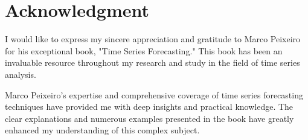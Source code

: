 \documentclass[journal]{IEEEtran}
\begin{document}
\section*{Acknowledgment}
I would like to express my sincere appreciation and gratitude to Marco
Peixeiro for his exceptional book, "Time Series Forecasting." This book has
been an invaluable resource throughout my research and study in the field of
time series analysis.

Marco Peixeiro's expertise and comprehensive coverage of time series
forecasting techniques have provided me with deep insights and practical
knowledge. The clear explanations and numerous examples presented in the book
have greatly enhanced my understanding of this complex subject.



\end{document}
